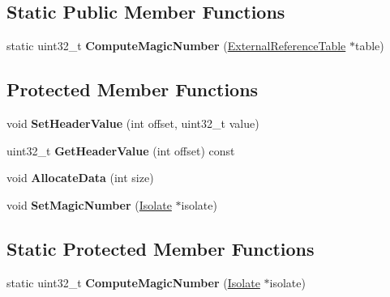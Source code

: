\subsection*{Static Public Member Functions}
\begin{DoxyCompactItemize}
\item 
static uint32\+\_\+t {\bfseries Compute\+Magic\+Number} (\hyperlink{classv8_1_1internal_1_1_external_reference_table}{External\+Reference\+Table} $\ast$table)\hypertarget{classv8_1_1internal_1_1_serialized_data_a86390ee13da8e398dc0bbcccd86b9a47}{}\label{classv8_1_1internal_1_1_serialized_data_a86390ee13da8e398dc0bbcccd86b9a47}

\end{DoxyCompactItemize}
\subsection*{Protected Member Functions}
\begin{DoxyCompactItemize}
\item 
void {\bfseries Set\+Header\+Value} (int offset, uint32\+\_\+t value)\hypertarget{classv8_1_1internal_1_1_serialized_data_ad1a6324c2b49b03630007e2037e37105}{}\label{classv8_1_1internal_1_1_serialized_data_ad1a6324c2b49b03630007e2037e37105}

\item 
uint32\+\_\+t {\bfseries Get\+Header\+Value} (int offset) const \hypertarget{classv8_1_1internal_1_1_serialized_data_a7eba2d739000cf73e89225159ec215d1}{}\label{classv8_1_1internal_1_1_serialized_data_a7eba2d739000cf73e89225159ec215d1}

\item 
void {\bfseries Allocate\+Data} (int size)\hypertarget{classv8_1_1internal_1_1_serialized_data_aa9b234507446a6251c5043d7f4e19b12}{}\label{classv8_1_1internal_1_1_serialized_data_aa9b234507446a6251c5043d7f4e19b12}

\item 
void {\bfseries Set\+Magic\+Number} (\hyperlink{classv8_1_1internal_1_1_isolate}{Isolate} $\ast$isolate)\hypertarget{classv8_1_1internal_1_1_serialized_data_a308da3a8f7ace2ead9fc60a0a12f1716}{}\label{classv8_1_1internal_1_1_serialized_data_a308da3a8f7ace2ead9fc60a0a12f1716}

\end{DoxyCompactItemize}
\subsection*{Static Protected Member Functions}
\begin{DoxyCompactItemize}
\item 
static uint32\+\_\+t {\bfseries Compute\+Magic\+Number} (\hyperlink{classv8_1_1internal_1_1_isolate}{Isolate} $\ast$isolate)\hypertarget{classv8_1_1internal_1_1_serialized_data_ae6d01b429a6eff04dc1b7c3f7dcfa7dd}{}\label{classv8_1_1internal_1_1_serialized_data_ae6d01b429a6eff04dc1b7c3f7dcfa7dd}

\end{DoxyCompactItemize}
